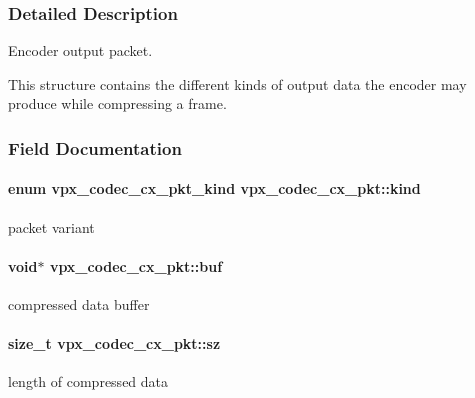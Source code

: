 \subsubsection{Detailed Description}
Encoder output packet. 

This structure contains the different kinds of output data the encoder may produce while compressing a frame. 

\subsubsection{Field Documentation}
\paragraph[{\texorpdfstring{kind}{kind}}]{\setlength{\rightskip}{0pt plus 5cm}enum {\bf vpx\+\_\+codec\+\_\+cx\+\_\+pkt\+\_\+kind} vpx\+\_\+codec\+\_\+cx\+\_\+pkt\+::kind}\hypertarget{structvpx__codec__cx__pkt_a41f395b39516343c1329a4a85a0084f2}{}\label{structvpx__codec__cx__pkt_a41f395b39516343c1329a4a85a0084f2}
packet variant 
\paragraph[{\texorpdfstring{buf}{buf}}]{\setlength{\rightskip}{0pt plus 5cm}void$\ast$ vpx\+\_\+codec\+\_\+cx\+\_\+pkt\+::buf}\hypertarget{structvpx__codec__cx__pkt_a9e1db068593b6037e70b05b5239784d2}{}\label{structvpx__codec__cx__pkt_a9e1db068593b6037e70b05b5239784d2}
compressed data buffer 
\paragraph[{\texorpdfstring{sz}{sz}}]{\setlength{\rightskip}{0pt plus 5cm}size\+\_\+t vpx\+\_\+codec\+\_\+cx\+\_\+pkt\+::sz}\hypertarget{structvpx__codec__cx__pkt_a857321ba2dc65e81c430d14c36a542d9}{}\label{structvpx__codec__cx__pkt_a857321ba2dc65e81c430d14c36a542d9}
length of compressed data 
